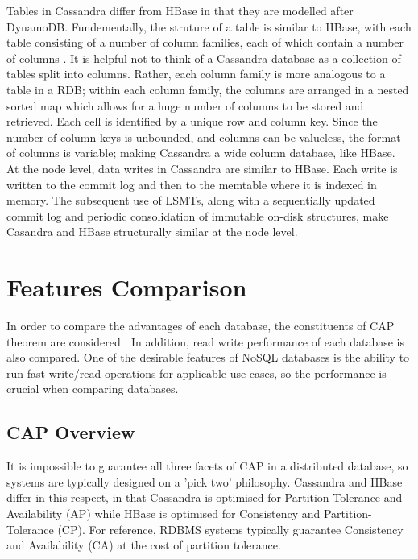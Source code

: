 \documentclass[10pt]{article}
\begin{document}
Tables in Cassandra differ from HBase in that they are modelled after DynamoDB. Fundementally, the struture of a table is similar to HBase, with each table consisting of a number of column families, each of which contain a number of columns \cite{7507964}. It is helpful not to think of a Cassandra database as a collection of tables split into columns. Rather, each column family is more analogous to a table in a RDB; within each column family, the columns are arranged in a nested sorted map which allows for a huge number of columns to be stored and retrieved. Each cell is identified by a unique row and column key. Since the number of column keys is unbounded, and columns can be valueless, the format of columns is variable; making Cassandra a wide column database, like HBase. \cite{harrison}\\

At the node level, data writes in Cassandra are similar to HBase. Each write is written to the commit log and then to the memtable where it is indexed in memory. The subsequent use of LSMTs, along with a sequentially updated commit log and periodic consolidation of immutable on-disk structures, make Casandra and HBase structurally similar at the node level.

\section{Features Comparison}
In order to compare the advantages of each database, the constituents of CAP theorem are considered \cite{harrison}.
In addition, read write performance of each database is also compared. One of the desirable features of NoSQL databases is the ability to run fast write/read operations for applicable use cases, so the performance is crucial when comparing databases.

\subsection{CAP Overview}
It is impossible to guarantee all three facets of CAP in a distributed database, so systems are typically designed on a 'pick two' philosophy. Cassandra and HBase differ in this respect, in that Cassandra is optimised for Partition Tolerance and Availability (AP) while HBase is optimised for Consistency and Partition-Tolerance (CP). For reference, RDBMS systems typically guarantee Consistency and Availability (CA) at the cost of partition tolerance\cite{harrison}.
\end{document}
